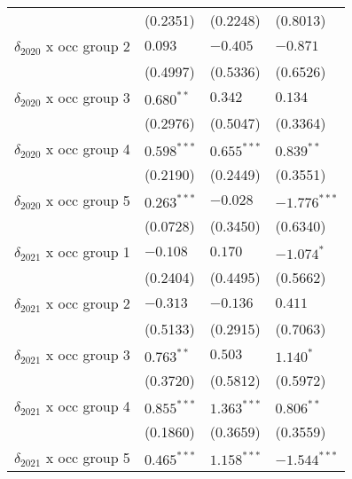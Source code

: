\begin{tabular}{llll}
                                       &           (0.2351) &           (0.2248) &           (0.8013) \\
$\delta_{2020}$ x occ group 2          &            $0.093$ &           $-0.405$ &           $-0.871$ \\
                                       &           (0.4997) &           (0.5336) &           (0.6526) \\
$\delta_{2020}$ x occ group 3          &       $0.680^{**}$ &            $0.342$ &            $0.134$ \\
                                       &           (0.2976) &           (0.5047) &           (0.3364) \\
$\delta_{2020}$ x occ group 4          &      $0.598^{***}$ &      $0.655^{***}$ &       $0.839^{**}$ \\
                                       &           (0.2190) &           (0.2449) &           (0.3551) \\
$\delta_{2020}$ x occ group 5          &      $0.263^{***}$ &           $-0.028$ &     $-1.776^{***}$ \\
                                       &           (0.0728) &           (0.3450) &           (0.6340) \\
$\delta_{2021}$ x occ group 1          &           $-0.108$ &            $0.170$ &         $-1.074^*$ \\
                                       &           (0.2404) &           (0.4495) &           (0.5662) \\
$\delta_{2021}$ x occ group 2          &           $-0.313$ &           $-0.136$ &            $0.411$ \\
                                       &           (0.5133) &           (0.2915) &           (0.7063) \\
$\delta_{2021}$ x occ group 3          &       $0.763^{**}$ &            $0.503$ &          $1.140^*$ \\
                                       &           (0.3720) &           (0.5812) &           (0.5972) \\
$\delta_{2021}$ x occ group 4          &      $0.855^{***}$ &      $1.363^{***}$ &       $0.806^{**}$ \\
                                       &           (0.1860) &           (0.3659) &           (0.3559) \\
$\delta_{2021}$ x occ group 5          &      $0.465^{***}$ &      $1.158^{***}$ &     $-1.544^{***}$ \\

\end{tabular}

